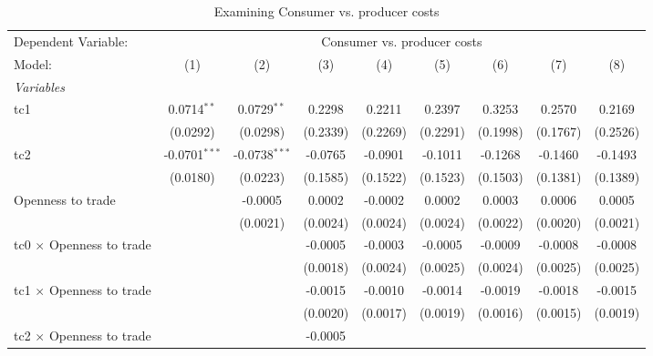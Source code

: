 
\begin{table}[htbp]
   \caption{Examining Consumer vs. producer costs}
   \centering
   \begin{tabular}{lcccccccc}
      \tabularnewline \midrule \midrule
      Dependent Variable: & \multicolumn{8}{c}{Consumer vs. producer costs}\\
      Model:                                  & (1)             & (2)             & (3)      & (4)      & (5)      & (6)      & (7)      & (8)\\  
      \midrule
      \emph{Variables}\\
      tc1                                     & 0.0714$^{**}$   & 0.0729$^{**}$   & 0.2298   & 0.2211   & 0.2397   & 0.3253   & 0.2570   & 0.2169\\   
                                              & (0.0292)        & (0.0298)        & (0.2339) & (0.2269) & (0.2291) & (0.1998) & (0.1767) & (0.2526)\\   
      tc2                                     & -0.0701$^{***}$ & -0.0738$^{***}$ & -0.0765  & -0.0901  & -0.1011  & -0.1268  & -0.1460  & -0.1493\\   
                                              & (0.0180)        & (0.0223)        & (0.1585) & (0.1522) & (0.1523) & (0.1503) & (0.1381) & (0.1389)\\   
      Openness to trade                       &                 & -0.0005         & 0.0002   & -0.0002  & 0.0002   & 0.0003   & 0.0006   & 0.0005\\   
                                              &                 & (0.0021)        & (0.0024) & (0.0024) & (0.0024) & (0.0022) & (0.0020) & (0.0021)\\   
      tc0 $\times$ Openness to trade          &                 &                 & -0.0005  & -0.0003  & -0.0005  & -0.0009  & -0.0008  & -0.0008\\   
                                              &                 &                 & (0.0018) & (0.0024) & (0.0025) & (0.0024) & (0.0025) & (0.0025)\\   
      tc1 $\times$ Openness to trade          &                 &                 & -0.0015  & -0.0010  & -0.0014  & -0.0019  & -0.0018  & -0.0015\\   
                                              &                 &                 & (0.0020) & (0.0017) & (0.0019) & (0.0016) & (0.0015) & (0.0019)\\   
      tc2 $\times$ Openness to trade          &                 &                 & -0.0005  &          &          &          &          &   \\   

\end{tabular}
\end{table}
